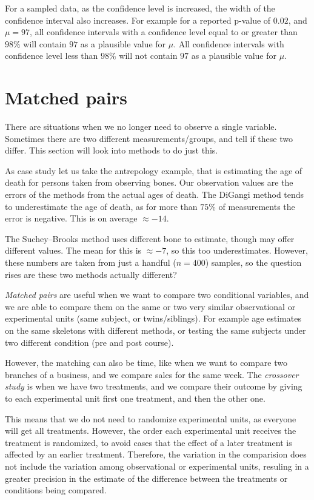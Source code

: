 For a sampled data, as the confidence level is increased, the width of the
confidence interval also increases. For example for a reported p-value of
$0.02$, and $\mu=97$, all confidence intervals with a confidence level equal to
or greater than $98\%$ will contain $97$ as a plausible value for $\mu$. All
confidence intervals with confidence level less than $98\%$ will not contain
$97$ as a plausible value for $\mu$.

\section{Matched pairs}

There are situations when we no longer need to observe a single variable.
Sometimes there are two different measurements/groups, and tell if these two
differ. This section will look into methods to do just this. 

As case study let us take the antrepology example, that is estimating the age
of death for persons taken from observing bones. Our observation values are the
errors of the methods from the actual ages of death. The DiGangi method tends to
underestimate the age of death, as for more than $75\%$ of measurements the
error is negative. This is on average $\approx -14$. 

The Suchey--Brooks method uses different bone to estimate, though may offer
different values. The mean for this is $\approx -7$, so this too underestimates.
However, these numbers are taken from just a handful ($n=400$) samples, so the
question rises are these two methods actually different?

\emph{Matched pairs} are useful when we want to compare two conditional
variables, and we are able to compare them on the same or two very similar
observational or experimental units (same subject, or twins/siblings). For
example age estimates on the same skeletons with different methods, or testing
the same subjects under two different condition (pre and post course).

However, the matching can also be time, like when we want to compare two
branches of a business, and we compare sales for the same week. The
\emph{crossover study} is when we have two treatments, and we compare their
outcome by giving to each experimental unit first one treatment, and then the
other one.

This means that we do not need to randomize experimental units, as
everyone will get all treatments. However, the order each experimental unit
receives the treatment is randomized, to avoid cases that the effect of a later
treatment is affected by an earlier treatment. Therefore, the variation in the
comparision does not include the variation among observational or experimental
units, resuling in a greater precision in the estimate of the difference between
the treatments or conditions being compared.

